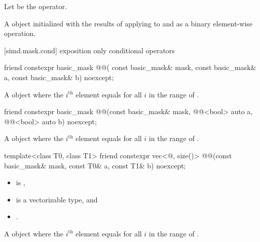 \begin{itemdescr}
\pnum
Let  be the operator.

\pnum
\returns
A  object initialized with the results of applying
 to  and  as a binary element-wise
operation.
\end{itemdescr}

[simd.mask.cond]{ exposition only conditional operators}

\begin{itemdecl}
friend constexpr basic_mask @@(
  const basic_mask& mask, const basic_mask& a, const basic_mask& b) noexcept;
\end{itemdecl}

\begin{itemdescr}
\pnum
\returns
A  object where the $i^\text{th}$ element equals
 for all $i$ in the range of
.
\end{itemdescr}

\begin{itemdecl}
friend constexpr basic_mask
@@(const basic_mask& mask, @@<bool> auto a, @@<bool> auto b) noexcept;
\end{itemdecl}

\begin{itemdescr}
\pnum
\returns
A  object where the $i^\text{th}$ element equals
 for all $i$ in the range of .
\end{itemdescr}

\begin{itemdecl}
template<class T0, class T1>
  friend constexpr vec<@\seebelow@, size()>
    @@(const basic_mask& mask, const T0& a, const T1& b) noexcept;
\end{itemdecl}

\begin{itemdescr}
\pnum
\constraints
\begin{itemize}
 \item
    is ,
 \item
    is a vectorizable type, and
 \item
   .
\end{itemize}

\pnum
\returns
A  object where the $i^\text{th}$ element equals
 for all $i$ in the range of .
\end{itemdescr}

